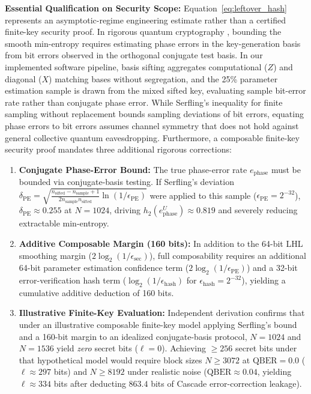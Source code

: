 \documentclass[journal,10pt,twocolumn]{article}
\begin{document}
\textbf{Essential Qualification on Security Scope:} Equation~\eqref{eq:leftover_hash} represents an asymptotic-regime engineering estimate rather than a certified finite-key security proof. In rigorous quantum cryptography \cite{tomamichel2012tight, scarani2008quantum}, bounding the smooth min-entropy requires estimating phase errors in the key-generation basis from bit errors observed in the orthogonal conjugate test basis. In our implemented software pipeline, basis sifting aggregates computational ($Z$) and diagonal ($X$) matching bases without segregation, and the 25\% parameter estimation sample is drawn from the mixed sifted key, evaluating sample bit-error rate rather than conjugate phase error. While Serfling's inequality for finite sampling without replacement \cite{serfling1974probability} bounds sampling deviations of bit errors, equating phase errors to bit errors assumes channel symmetry that does not hold against general collective quantum eavesdropping. Furthermore, a composable finite-key security proof mandates three additional rigorous corrections:
\begin{enumerate}
    \item \textbf{Conjugate Phase-Error Bound:} The true phase-error rate $e_{\text{phase}}$ must be bounded via conjugate-basis testing. If Serfling's deviation $\delta_{\text{PE}} = \sqrt{\frac{n_{\text{sifted}} - n_{\text{sample}} + 1}{2 n_{\text{sample}} n_{\text{sifted}}} \ln(1/\epsilon_{\text{PE}})}$ were applied to this sample ($\epsilon_{\text{PE}} = 2^{-32}$), $\delta_{\text{PE}} \approx 0.255$ at $N=1024$, driving $h_2(e_{\text{phase}}^U) \approx 0.819$ and severely reducing extractable min-entropy.
    \item \textbf{Additive Composable Margin (160 bits):} In addition to the 64-bit LHL smoothing margin ($2\log_2(1/\epsilon_{\text{sec}})$), full composability requires an additional 64-bit parameter estimation confidence term ($2\log_2(1/\epsilon_{\text{PE}})$) and a 32-bit error-verification hash term ($\log_2(1/\epsilon_{\text{hash}})$ for $\epsilon_{\text{hash}}=2^{-32}$), yielding a cumulative additive deduction of 160 bits.
    \item \textbf{Illustrative Finite-Key Evaluation:} Independent derivation confirms that under an illustrative composable finite-key model applying Serfling's bound and a 160-bit margin to an idealized conjugate-basis protocol, $N=1024$ and $N=1536$ yield \emph{zero} secret bits ($\ell = 0$). Achieving $\ge 256$ secret bits under that hypothetical model would require block sizes $N \ge 3072$ at $\text{QBER}=0.0$ ($\ell \approx 297$ bits) and $N \ge 8192$ under realistic noise ($\text{QBER} \approx 0.04$, yielding $\ell \approx 334$ bits after deducting $863.4$ bits of Cascade error-correction leakage).
\end{enumerate}
\end{document}
